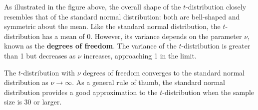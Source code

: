 \documentclass[twoside]{book}
\begin{document}
\begin{center}
\end{center}
As illustrated in the figure above, the overall shape of the \( t \)-distribution closely resembles that of the standard normal distribution: both are bell-shaped and symmetric about the mean. Like the standard normal distribution, the \( t \)-distribution has a mean of 0. However, its variance depends on the parameter \( \nu \), known as the \textbf{degrees of freedom}. The variance of the \( t \)-distribution is greater than 1 but decreases as \( \nu \) increases, approaching 1 in the limit. 

\begin{textbox}
The \( t \)-distribution with \( \nu \) degrees of freedom converges to the standard normal distribution as \( \nu \to \infty \). As a general rule of thumb, the standard normal distribution provides a good approximation to the \( t \)-distribution when the sample size is 30 or larger.
\end{textbox}
\end{document}
